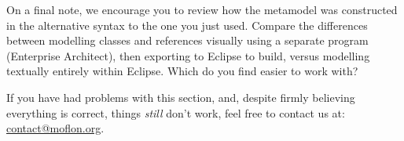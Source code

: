 On a final note, we encourage you to review how the metamodel was constructed in the alternative syntax to the one you just used. Compare the
differences between modelling classes and references visually using a separate program (Enterprise Architect), then exporting to Eclipse to build, versus
modelling textually entirely within Eclipse. Which do you find easier to work with?

If you have had problems with this section, and, despite firmly believing everything is correct, things \emph{still} don't work, feel free to contact us at:\\ 
\href{mailto:contact@moflon.org}{contact@moflon.org}.

